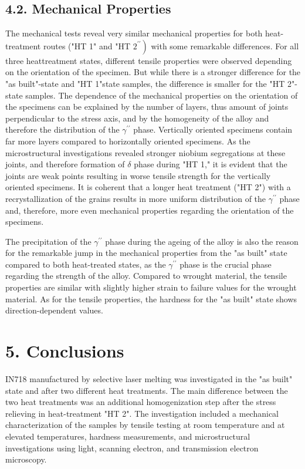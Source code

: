 \documentclass[10pt]{article}
\begin{document}
\subsection*{4.2. Mechanical Properties}
The mechanical tests reveal very similar mechanical properties for both heat-treatment routes ("HT 1" and "HT $\left.2^{\prime \prime}\right)$ with some remarkable differences. For all three heattreatment states, different tensile properties were observed depending on the orientation of the specimen. But while there is a stronger difference for the "as built"-state and "HT 1"state samples, the difference is smaller for the "HT 2"-state samples. The dependence of the mechanical properties on the orientation of the specimens can be explained by the number of layers, thus amount of joints perpendicular to the stress axis, and by the homogeneity of the alloy and therefore the distribution of the $\gamma^{\prime \prime}$ phase. Vertically oriented specimens contain far more layers compared to horizontally oriented specimens. As the microstructural investigations revealed stronger niobium segregations at these joints, and therefore formation of $\delta$ phase during "HT 1," it is evident that the joints are weak points resulting in worse tensile strength for the vertically oriented specimens. It is coherent that a longer heat treatment ("HT 2") with a recrystallization of the grains results in more uniform distribution of the $\gamma^{\prime \prime}$ phase and, therefore, more even mechanical properties regarding the orientation of the specimens.

The precipitation of the $\gamma^{\prime \prime}$ phase during the ageing of the alloy is also the reason for the remarkable jump in the mechanical properties from the "as built" state compared to both heat-treated states, as the $\gamma^{\prime \prime}$ phase is the crucial phase regarding the strength of the alloy. Compared to wrought material, the tensile properties are similar with slightly higher strain to failure values for the wrought material. As for the tensile properties, the hardness for the "as built" state shows direction-dependent values.

\section*{5. Conclusions}
IN718 manufactured by selective laser melting was investigated in the "as built" state and after two different heat treatments. The main difference between the two heat treatments was an additional homogenization step after the stress relieving in heat-treatment "HT 2". The investigation included a mechanical characterization of the samples by tensile testing at room temperature and at elevated temperatures, hardness measurements, and microstructural investigations using light, scanning electron, and transmission electron microscopy.
\end{document}
